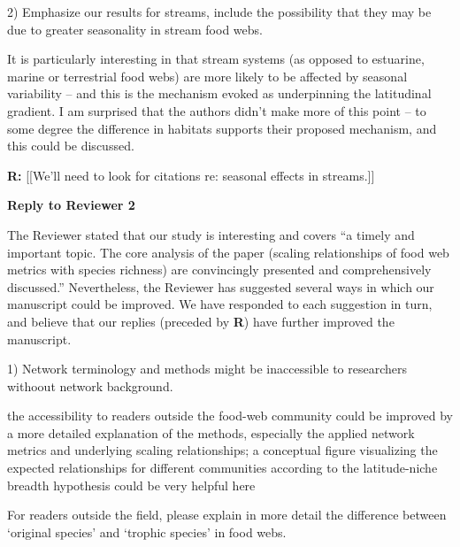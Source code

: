 \documentclass[12pt]{letter}
\newenvironment{refquote}{\bigskip \begin{it}}{\end{it}\smallskip}
\begin{document}
   2) Emphasize our results for streams, include the possibility that they
   may be due to greater seasonality in stream food webs. 

  \begin{refquote}

    It is particularly interesting in that stream systems (as opposed to
    estuarine, marine or terrestrial food webs) are more likely to be affected
    by seasonal variability – and this is the mechanism evoked as underpinning
    the latitudinal gradient. I am surprised that the authors didn’t make more
    of this point – to some degree the difference in habitats supports their
    proposed mechanism, and this could be discussed.

  \end{refquote}


  \textbf{R:} [[We'll need to look for citations re: seasonal effects in streams.]]


  \begin{quotation}


  \end{quotation}


  \newpage

{\Large \bf Reply to Reviewer 2}

  The Reviewer stated that our study is interesting and covers ``a timely and
  important topic. The core analysis of the paper (scaling relationships of
  food web metrics with species richness) are convincingly presented and
  comprehensively discussed.'' Nevertheless, the Reviewer has suggested several
  ways in which our manuscript could be improved. We have responded to each suggestion
  in turn, and believe that our replies (preceded by \textbf{R}) have further improved
  the manuscript.



  1) Network terminology and methods might be inaccessible to researchers
  withoout network background.

  \begin{refquote}

    the accessibility to readers outside the food-web community could be
    improved by a more detailed explanation of the methods, especially the
    applied network metrics and underlying scaling relationships; a conceptual
    figure visualizing the expected relationships for different communities
    according to the latitude-niche breadth hypothesis could be very helpful
    here

    \smallskip

     For readers outside the field, please explain in more detail the
     difference between `original species' and `trophic species' in food webs.

  \end{refquote}
\end{document}
